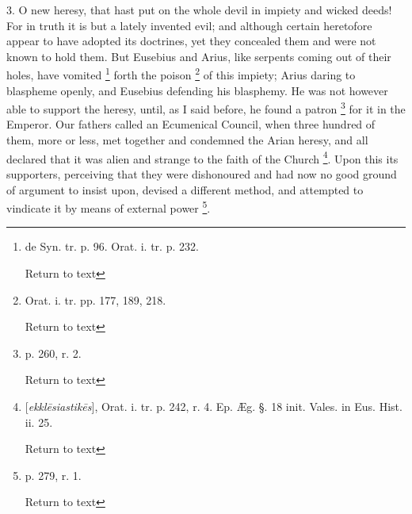 3. O new heresy, that hast put on the whole devil
in impiety and wicked deeds! For in truth it is but a lately invented
evil; and although certain heretofore appear to have adopted its
doctrines, yet they concealed them and were not known to hold them.
But Eusebius and Arius, like serpents coming out of their holes,
have vomited \footnote{de Syn. tr. p. 96. Orat. i. tr. p. 232.

Return to text} forth the poison
\footnote{Orat. i. tr. pp. 177, 189, 218.

Return to text} of this impiety;
Arius daring to blaspheme openly, and Eusebius defending his
blasphemy. He was not however able to support the heresy, until, as I
said before, he found a patron \footnote{p. 260, r. 2.

Return to text} for it in the Emperor. Our
fathers called an Ecumenical Council, when three hundred of them, more
or less, met together and condemned the Arian heresy, and all declared
that it was alien and strange to the faith of the Church \footnote{[\emph{ekkl\={e}siastik\={e}s}], Orat.
i. tr. p. 242, r. 4. Ep. Æg. §. 18 init. Vales. in Eus. Hist. ii.
25.

Return to text}.
Upon this its supporters, perceiving that they were dishonoured and
had now no good ground of argument to insist upon, devised a different
method, and attempted to vindicate it by means of external power \footnote{p. 279, r. 1.

Return to text}.

